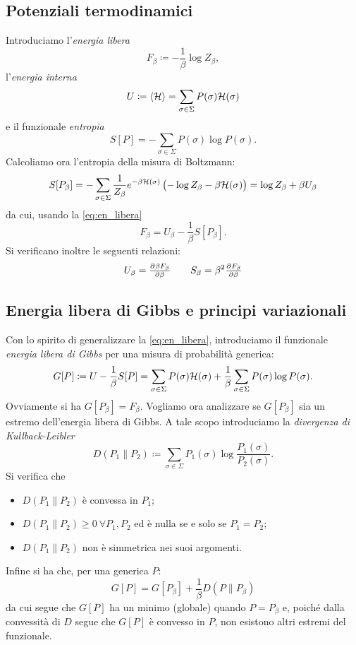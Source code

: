 \subsection{Potenziali termodinamici}
Introduciamo l'\emph{energia libera}
\begin{equation}\label{eq:en_libera}
    F_\beta \coloneqq -\frac{1}{\beta} \log{Z_\beta},
\end{equation}
l'\emph{energia interna}
\[ U \coloneqq \langle\mathcal{H}\rangle = \sum_{\sigma\in\Sigma} P(\sigma)\mathcal{H}(\sigma) \]
e il funzionale \emph{entropia}
\[ S[P] = -\sum_{\sigma\in\Sigma} P(\sigma) \log{P(\sigma)}. \]
Calcoliamo ora l'entropia della misura di Boltzmann:
\[ S[P_\beta] = - \sum_{\sigma\in\Sigma} \frac{1}{Z_\beta}e^{-\beta\mathcal{H}(\sigma)} \left( -\log{Z_\beta}  - \beta\mathcal{H}(\sigma) \right) = \log{Z_\beta} + \beta U_\beta \]
da cui, usando la \eqref{eq:en_libera}
\[ F_\beta = U_\beta - \frac{1}{\beta} S[P_\beta]. \]
Si verificano inoltre le seguenti relazioni:
\[ U_\beta = \pd{\beta F_\beta}{\beta} \qquad S_\beta = \beta^2 \pd{F_\beta}{\beta} \]

\subsection{Energia libera di Gibbs e principi variazionali}
Con lo spirito di generalizzare la \eqref{eq:en_libera}, introduciamo il funzionale \emph{energia libera di Gibbs} per una misura di probabilità generica:
\[ G[P] \coloneqq U - \frac{1}{\beta} S[P] = \sum_{\sigma\in\Sigma} P(\sigma)\mathcal{H}(\sigma) + \frac{1}{\beta}\sum_{\sigma\in\Sigma} P(\sigma) \log{P(\sigma)}. \]
Ovviamente si ha $ G[P_\beta] = F_\beta $. Vogliamo ora analizzare se $ G[P_\beta] $ sia un estremo dell'energia libera di Gibbs. A tale scopo introduciamo la \emph{divergenza di Kullback-Leibler}
\[ D(P_1 \parallel P_2) \coloneqq \sum_{\sigma\in\Sigma} P_1(\sigma) \log{\frac{P_1(\sigma)}{P_2(\sigma)}}. \]
Si verifica che
\begin{itemize}
    \item $ D(P_1 \parallel P_2) $ è convessa in $ P_1 $;
    \item $ D(P_1 \parallel P_2) \geq 0 \ \forall P_1, P_2 $ ed è nulla se e solo se $ P_1 = P_2 $;
    \item $ D(P_1 \parallel P_2) $ non è simmetrica nei suoi argomenti.
\end{itemize}
Infine si ha che, per una generica $ P $:
\[ G[P] = G[P_\beta] + \frac{1}{\beta} D(P \parallel P_\beta) \]
da cui segue che $ G[P] $ ha un minimo (globale) quando $ P = P_\beta $ e, poiché dalla convessità di $ D $ segue che $ G[P] $ è convesso in $ P $, non esistono altri estremi del funzionale.

